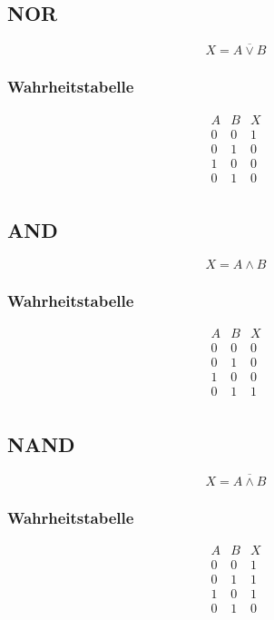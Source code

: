 \subsection{NOR}
\[ X = \overline{A \lor B} \]
\subsubsection{Wahrheitstabelle}
\begin{table}[h!]
\[ \begin{array}{cc|c}
A&B&X\\
\hline
0&0&1\\
0&1&0\\
1&0&0\\
0&1&0\\
\end{array} \]
\end{table}

\subsection{AND}
\[ X = A \land B \]
\subsubsection{Wahrheitstabelle}
\begin{table}[h!]
\[ \begin{array}{cc|c}
A&B&X\\
\hline
0&0&0\\
0&1&0\\
1&0&0\\
0&1&1\\
\end{array} \]
\end{table}

\subsection{NAND}
\[ X = \overline{A \land B} \]
\subsubsection{Wahrheitstabelle}
\begin{table}[h!]
\[ \begin{array}{cc|c}
A&B&X\\
\hline
0&0&1\\
0&1&1\\
1&0&1\\
0&1&0\\
\end{array} \]
\end{table}

